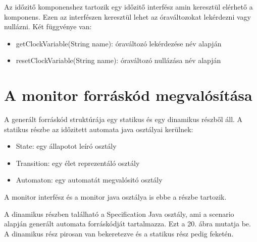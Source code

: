 Az időzitő komponenshez tartozik egy időzitő interfész amin keresztül elérhető a komponens. Ezen az interfészen keresztül lehet az óraváltozokat lekérdezni vagy nullázni. Két függvénye van:
\begin{itemize}
    \item getClockVariable(String name): óraváltozó lekérdezése név alapján
    \item resetClockVariable(String name): óraváltozó nullázása név alapján
\end{itemize}

\section{A monitor forráskód megvalósítása}
A generált forráskód struktúrája egy statikus és egy dinamikus részből áll.
A statikus részbe az időzitett automata java osztályai kerülnek:
\begin{itemize}
    \item State: egy állapotot leíró osztály
    \item Transition: egy élet reprezentáló osztály
    \item Automaton: egy automatát megvalósitó osztály
\end{itemize}

A monitor interfész és a monitor java osztálya is ebbe a részbe tartozik.

A dinamikus részben található a Specification Java osztály, ami a scenario alapján generált automata forráskódját tartalmazza. Ezt a 20. ábra mutatja be. A dinamikus rész pirosan van bekeretezve és a statikus rész pedig feketén.

